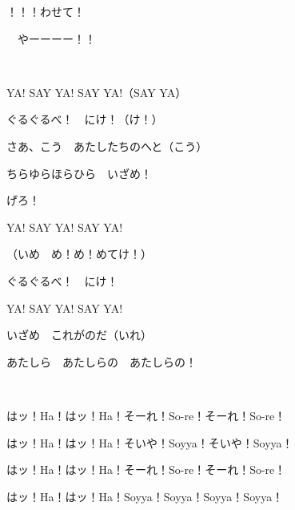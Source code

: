 ！！！わせて！

　やーーーー！！

~

YA! SAY YA! SAY YA!（SAY YA）

ぐるぐるべ！　にけ！（け！）

さあ、こう　あたしたちのへと（こう）

ちらゆらほらひら　いざめ！

げろ！

YA! SAY YA! SAY YA!

（いめ　め！め！めてけ！）

ぐるぐるべ！　にけ！

YA! SAY YA! SAY YA!

いざめ　これがのだ（いれ）

あたしら　あたしらの　あたしらの！

~

はッ！Ha！はッ！Ha！そーれ！So-re！そーれ！So-re！

はッ！Ha！はッ！Ha！そいや！Soyya！そいや！Soyya！

はッ！Ha！はッ！Ha！そーれ！So-re！そーれ！So-re！

はッ！Ha！はッ！Ha！Soyya！Soyya！Soyya！Soyya！
